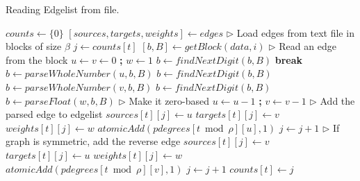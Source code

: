 \begin{algorithm}[hbtp]
\caption{Reading Edgelist from file.}
\label{alg:el}
\begin{algorithmic}[1]

\Statex

 \label{alg:el--read-edgelist-begin}
  \State $counts \gets \{0\}$ \label{alg:el--initialize-begin}
  \State $[sources, targets, weights] \gets edges$ \label{alg:el--initialize-end}
  \State $\rhd$ Load edges from text file in blocks of size $\beta$
   \label{alg:el--blocks-begin}
    \State $j \gets counts[t]$
    \State $[b, B] \gets getBlock(data, i)$ \label{alg:el--get-block}
     \label{alg:el--block-begin}
      \State $\rhd$ Read an edge from the block
      \State $u \gets v \gets 0$ \textbf{;} $w \gets 1$ \label{alg:el--parse-edge-begin}
      \State $b \gets findNextDigit(b, B)$
       \textbf{break}
      \EndIf
      \State $b \gets parseWholeNumber(u, b, B)$
      \State $b \gets findNextDigit(b, B)$
      \State $b \gets parseWholeNumber(v, b, B)$
        \State $b \gets findNextDigit(b, B)$
        \State $b \gets parseFloat(w, b, B)$
      \EndIf \label{alg:el--parse-edge-end}
      \State $\rhd$ Make it zero-based
      \State $u \gets u - 1$ \textbf{;} $v \gets v - 1$ \label{alg:el--base1}
      \State $\rhd$ Add the parsed edge to edgelist
      \State $sources[t][j] \gets u$ \label{alg:el--add-edge-begin}
      \State $targets[t][j] \gets v$
       $weights[t][j] \gets w$
      \EndIf
      \State $atomicAdd(pdegrees[t \bmod \rho][u], 1)$ \label{alg:el--update-degrees}
      \State $j \gets j + 1$ \label{alg:el--add-edge-end}
      \State $\rhd$ If graph is symmetric, add the reverse edge
       \label{alg:el--reverse-edge-begin}
        \State $sources[t][j] \gets v$
        \State $targets[t][j] \gets u$
         $weights[t][j] \gets w$
        \EndIf
        \State $atomicAdd(pdegrees[t \bmod \rho][v], 1)$
        \State $j \gets j + 1$
      \EndIf \label{alg:el--reverse-edge-end}
    \EndWhile \label{alg:el--block-end}
    \State $counts[t] \gets j$ \label{alg:el--update-counts}
  \EndFor \label{alg:el--blocks-end}
   \label{alg:el--return-counts}
\EndFunction \label{alg:el--read-edgelist-end}


\end{algorithmic}
\end{algorithm}
